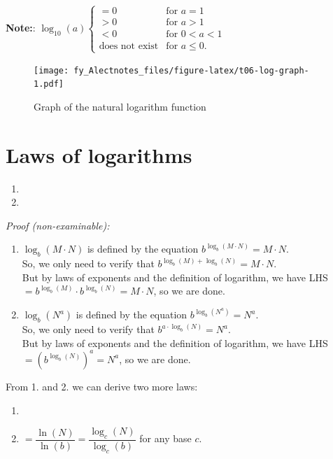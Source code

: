 \documentclass[
  12pt,
  oneside]{book}
\theoremstyle{definition}
\theoremstyle{definition}
\theoremstyle{definition}
\theoremstyle{definition}
\theoremstyle{remark}
\begin{document}
\textbf{Note:}: \(\log_{10}(a) \begin{cases} =0 & \text{for }a=1\\ >0& \text{for }a>1\\ <0 &\text{for }0<a<1\\\text{does not exist}&\text{for }a\leq0.\end{cases}\)

\begin{figure}
\centering
\texttt{[image: fy\_Alectnotes\_files/figure-latex/t06-log-graph-1.pdf]}
\caption{\label{fig:t06-log-graph}Graph of the natural logarithm function}
\end{figure}

\hypertarget{laws-of-logarithms}{%
\section{Laws of logarithms}\label{laws-of-logarithms}}

\begin{enumerate}
\def\labelenumi{\arabic{enumi}.}
\item
\item
\end{enumerate}

\emph{Proof (non-examinable):}

\begin{enumerate}
\def\labelenumi{\arabic{enumi}.}
\item
  \(\log_b(M\cdot N)\) is defined by the equation \(b^{\log_b(M\cdot N)}=M\cdot N\).\\
  So, we only need to verify that \(b^{\log_b(M)+\log_b(N)}=M\cdot N\).\\
  But by laws of exponents and the definition of logarithm, we have LHS \(= b^{\log_b(M)}\cdot b^{\log_b(N)}=M\cdot N\), so we are done.
\item
  \(\log_b(N^a)\) is defined by the equation \(b^{\log_b(N^a)}=N^a\).\\
  So, we only need to verify that \(b^{a\cdot \log_b(N)}=N^a\).\\
  But by laws of exponents and the definition of logarithm, we have LHS \(= \left(b^{\log_b(N)}\right)^a= N^a\), so we are done.
\end{enumerate}

From 1. and 2. we can derive two more laws:

\begin{enumerate}
\def\labelenumi{\arabic{enumi}.}
\setcounter{enumi}{2}
\item
\item
   \(=\dfrac{\ln(N)}{\ln(b)} = \dfrac{\log_c(N)}{\log_c(b)}\) for any base \(c\).
\end{enumerate}
\end{document}
